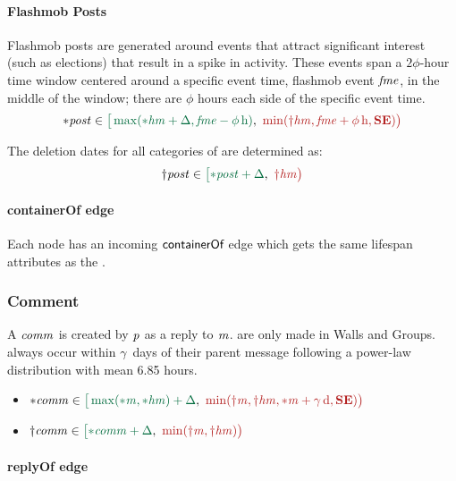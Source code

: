 \paragraph{Flashmob Posts}

Flashmob posts are generated around events that attract significant interest
(such as elections) that result in a spike in activity.
These events span a $2\phi$-hour time window centered around a specific event time, flashmob event $\mathit{fme}$, in the middle of the window; there are $\phi$ hours each side of the specific event time.
$$
\varc{\ePost} \in \interval{\max(\varc{\eHasMember} + \Delta,\eFlashmobEvent - \phi\textrm{\,h})}{\min (\vard{\eHasMember},\eFlashmobEvent + \phi\textrm{\,h},\xSE)}
$$

The deletion dates for all categories of \tPosts are determined as:
$$\vard{\ePost} \in \interval{\varc{\ePost} + \Delta}{\vard{\eHasMember}}$$

\paragraph{containerOf edge}

Each \tPost node has an incoming $\textsf{containerOf}$ edge which gets the same lifespan attributes as the \tPost.

\subsubsection{Comment}

A \tComment $\mathit{comm}$ is created by \tPerson $\mathit{p}$ as a reply to \tMessage $\mathit{m}$. \tComments are only made in Walls and Groups. \tComment always occur within $\gamma$~days of their parent message following a power-law distribution with mean 6.85 hours.

\begin{itemize}
    \item $\varc{\eComment} \in \interval{\max (\varc{\eMessage}, \varc{\eHasMember}) + \Delta}{\min (\vard{\eMessage}, \vard{\eHasMember}, \varc{\eMessage} + \gamma\textrm{\,d}, \xSE)}$
    \item $\vard{\eComment} \in \interval{\varc{\eComment} + \Delta}{\min (\vard{\eMessage}, \vard{\eHasMember})}$
\end{itemize}

\paragraph{replyOf edge}

